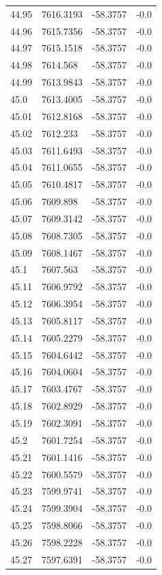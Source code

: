 \begin{table}[H]
\begin{tabular}{llll}
44.95 & 7616.3193 & -58.3757 & -0.0 \\
44.96 & 7615.7356 & -58.3757 & -0.0 \\
44.97 & 7615.1518 & -58.3757 & -0.0 \\
44.98 & 7614.568 & -58.3757 & -0.0 \\
44.99 & 7613.9843 & -58.3757 & -0.0 \\
45.0 & 7613.4005 & -58.3757 & -0.0 \\
45.01 & 7612.8168 & -58.3757 & -0.0 \\
45.02 & 7612.233 & -58.3757 & -0.0 \\
45.03 & 7611.6493 & -58.3757 & -0.0 \\
45.04 & 7611.0655 & -58.3757 & -0.0 \\
45.05 & 7610.4817 & -58.3757 & -0.0 \\
45.06 & 7609.898 & -58.3757 & -0.0 \\
45.07 & 7609.3142 & -58.3757 & -0.0 \\
45.08 & 7608.7305 & -58.3757 & -0.0 \\
45.09 & 7608.1467 & -58.3757 & -0.0 \\
45.1 & 7607.563 & -58.3757 & -0.0 \\
45.11 & 7606.9792 & -58.3757 & -0.0 \\
45.12 & 7606.3954 & -58.3757 & -0.0 \\
45.13 & 7605.8117 & -58.3757 & -0.0 \\
45.14 & 7605.2279 & -58.3757 & -0.0 \\
45.15 & 7604.6442 & -58.3757 & -0.0 \\
45.16 & 7604.0604 & -58.3757 & -0.0 \\
45.17 & 7603.4767 & -58.3757 & -0.0 \\
45.18 & 7602.8929 & -58.3757 & -0.0 \\
45.19 & 7602.3091 & -58.3757 & -0.0 \\
45.2 & 7601.7254 & -58.3757 & -0.0 \\
45.21 & 7601.1416 & -58.3757 & -0.0 \\
45.22 & 7600.5579 & -58.3757 & -0.0 \\
45.23 & 7599.9741 & -58.3757 & -0.0 \\
45.24 & 7599.3904 & -58.3757 & -0.0 \\
45.25 & 7598.8066 & -58.3757 & -0.0 \\
45.26 & 7598.2228 & -58.3757 & -0.0 \\
45.27 & 7597.6391 & -58.3757 & -0.0 \\

\end{tabular}
\end{table}
